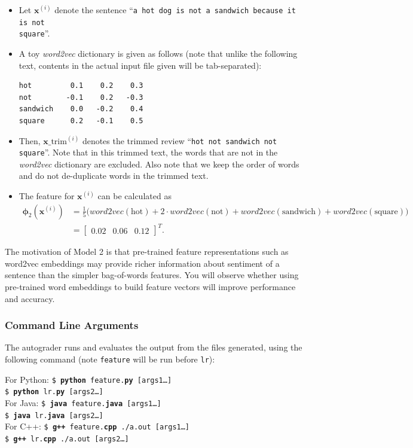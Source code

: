 \documentclass[11pt,addpoints,answers]{exam}
\newcommand{\xv}{\mathbf{x}}
\begin{document}
\begin{itemize}
    \item Let $\xv^{(i)}$ denote the sentence ``\texttt{a hot dog is not a sandwich because it is not\\ square}''.
    \item A toy \emph{word2vec} dictionary is given as follows (note that unlike the following text, contents in the actual input file given will be tab-separated): 
    \begin{lstlisting}
hot         0.1    0.2    0.3
not        -0.1    0.2   -0.3
sandwich    0.0   -0.2    0.4
square      0.2   -0.1    0.5
    \end{lstlisting}
    \item Then, $\xv\_\text{trim}^{(i)}$ denotes the trimmed review ``\texttt{hot not sandwich not square}''. Note that in this trimmed text, the words that are not in the \emph{word2vec} dictionary are excluded. Also note that we keep the order of words and do not de-duplicate words in the trimmed text.
    \item The feature for $\xv^{(i)}$ can be calculated as
        \begin{align*} \boldsymbol{\phi}_2(\xv^{(i)}) &= \frac{1}{5}\big( word2vec(\text{hot}) + 2 \cdot word2vec(\text{not}) + word2vec(\text{sandwich}) + word2vec(\text{square}) \big) \\
        &= \begin{bmatrix} 0.02 & 0.06 & 0.12 \end{bmatrix}^T.
        \end{align*}
\end{itemize}


The motivation of Model 2 is that pre-trained feature representations such as word2vec embeddings may provide richer information about sentiment of a sentence than the simpler bag-of-words features. You will observe whether using pre-trained word embeddings to build feature vectors will improve performance and accuracy.


\subsubsection{Command Line Arguments}
The autograder runs and evaluates the output from the files generated, using the following command (note \lstinline{feature} will be run before \lstinline{lr}):

\begin{tabbing}
For Python: \=\texttt{\$ \textbf{python} feature.\textbf{py} [args1\dots]}\\
\>\texttt{\$ \textbf{python} lr.\textbf{py} [args2\dots]}\\
For Java: \>\texttt{\$ \textbf{java} feature.\textbf{java} [args1\dots]}\\
\>\texttt{\$ \textbf{java} lr.\textbf{java} [args2\dots]}\\
For C++: \>\texttt{\$ \textbf{g++} feature.\textbf{cpp} ./a.out [args1\dots]}\\
\>\texttt{\$ \textbf{g++} lr.\textbf{cpp} ./a.out [args2\dots]}
\end{tabbing}
\end{document}
